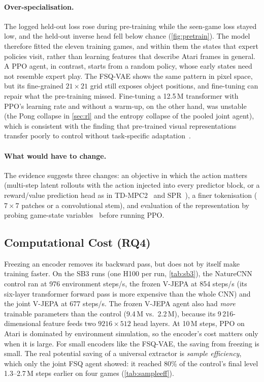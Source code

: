 \documentclass[runningheads]{llncs}
\begin{document}
\paragraph{Over-specialisation.}
The logged held-out loss rose during pre-training while the seen-game loss stayed low, and
the held-out inverse head fell below chance (\cref{fig:pretrain}). The model therefore fitted
the eleven training games, and within them the states that expert policies visit, rather than
learning features that describe Atari frames in general. A PPO agent, in contrast, starts
from a random policy, whose early states need not resemble expert play. The FSQ-VAE shows
the same pattern in pixel space, but its fine-grained $21\times21$ grid still exposes object
positions, and fine-tuning can repair what the pre-training missed. Fine-tuning a 12.5\,M
transformer with PPO's learning rate and without a warm-up, on the other hand, was unstable
(the Pong collapse in \cref{sec:rl} and the entropy collapse of the pooled joint agent), which
is consistent with the finding that pre-trained visual representations transfer poorly to
control without task-specific adaptation~\cite{hansen2022pretrained,parisi2022pvr}.

\paragraph{What would have to change.}
The evidence suggests three changes: an objective in which the action matters (multi-step
latent rollouts with the action injected into every predictor block, or a reward/value
prediction head as in TD-MPC2~\cite{hansen2024tdmpc2} and SPR~\cite{schwarzer2021spr}), a
finer tokenisation ($7\times7$ patches or a convolutional stem), and evaluation of the
representation by probing game-state variables~\cite{anand2019atariari} before running PPO.

\subsection{Computational Cost (RQ4)}
\label{sec:compute}

Freezing an encoder removes its backward pass, but does not by itself make training
faster. On the SB3 runs (one H100 per run, \cref{tab:sb3}), the NatureCNN control ran at
976 environment steps/s, the frozen V-JEPA at 854 steps/s (its six-layer transformer
forward pass is more expensive than the whole CNN) and the joint V-JEPA at 677 steps/s.
The frozen V-JEPA agent also had \emph{more} trainable parameters than the control
(9.4\,M vs.\ 2.2\,M), because its 9\,216-dimensional feature feeds two
$9216\times512$ head layers. At 10\,M steps, PPO on Atari is dominated by environment
simulation, so the encoder's cost matters only when it is large. For small encoders like
the FSQ-VAE, the saving from freezing is small. The real potential saving of a universal
extractor is \emph{sample efficiency}, which only the joint FSQ agent showed: it reached
80\% of the control's final level 1.3--2.7\,M steps earlier on four games
(\cref{tab:sampleeff}).
\end{document}
